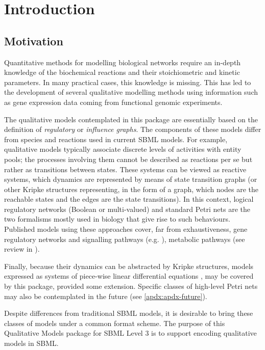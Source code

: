 
\section{Introduction}
\label{intro}

\subsection{Motivation}

Quantitative methods for modelling biological networks require an
in-depth knowledge of the biochemical reactions and their stoichiometric
and kinetic parameters. In many practical cases, this knowledge is
missing. This has led to the development of several qualitative
modelling methods using information such as gene expression data coming
from functional genomic experiments.

The qualitative models contemplated in this package are essentially
based on the definition of \emph{regulatory} or \emph{influence
  graphs}. The components of these models differ from species and
reactions used in current SBML models. For example, qualitative models
typically associate discrete levels of activities with entity pools; the
processes involving them cannot be described as reactions per se but
rather as transitions between states. These systems can be viewed as
reactive systems, which dynamics are represented by means of state
transition graphs (or other Kripke structures representing, in the form
of a graph, which nodes are the reachable states and the edges are the
state transitions). In this context, logical regulatory networks
(Boolean or multi-valued) \cite{kauffman69,thomas91} and standard Petri
nets \cite{chaouiya07} are the two formalisms mostly used in biology
that give rise to such behaviours. Published models using these approaches cover, far from exhaustiveness, gene regulatory networks and signalling pathways (e.g. \cite{thieffry95,sanchez03,albert03,faure06,mendoza06,helikar08,naldi10,calzone10}), metabolic pathways (see review in \cite{chaouiya07}). 

Finally, because their dynamics can be abstracted by Kripke structures, models expressed as systems of piece-wise linear differential equations \cite{batt05}, may be covered by this package, provided some extension. Specific classes of high-level Petri nets may also be contemplated in the future (see \ref{apdx:apdx-future}).

 Despite differences from traditional SBML models, it is desirable to
 bring these classes of models under a common format scheme. The purpose
 of this Qualitative Models package for SBML Level 3 is to support
 encoding qualitative models in SBML.

